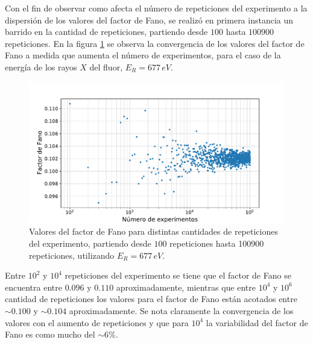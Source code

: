 Con el fin de observar como afecta el número de repeticiones del experimento a la dispersión de los valores del factor de Fano, se realizó en primera instancia un barrido en la cantidad de repeticiones, partiendo desde $100$ hasta $100900$ repeticiones. En la figura \ref{fig:FanoConvergencia} se observa la convergencia de los valores del factor de Fano a medida que aumenta el número de experimentos, para el caso de la energía de los rayos $X$ del fluor, $E_{R} = 677\,\si{eV}$.
\begin{figure}%
    \centering
    \includegraphics[scale=0.5]{Figs/FanoConvergencia.pdf}
    \caption{\footnotesize{Valores del factor de Fano para distintas cantidades de repeticiones del experimento, partiendo desde $100$ repeticiones hasta 100900 repeticiones, utilizando $E_{R} = 677\,\si{eV}$.}}
    \label{fig:FanoConvergencia}
\end{figure}
Entre $10^{2}$ y $10^{4}$ repeticiones del experimento se tiene que el factor de Fano se encuentra entre $0.096$ y $0.110$ aproximadamente, mientras que entre $10^{4}$ y $10^{6}$ cantidad de repeticiones los valores para el factor de Fano están acotados entre $\sim 0.100$ y $\sim 0.104$ aproximadamente. Se nota claramente la convergencia de los valores con el aumento de repeticiones y que para $10^{4}$ la variabilidad del factor de Fano es como mucho del $\sim 6\%$.



